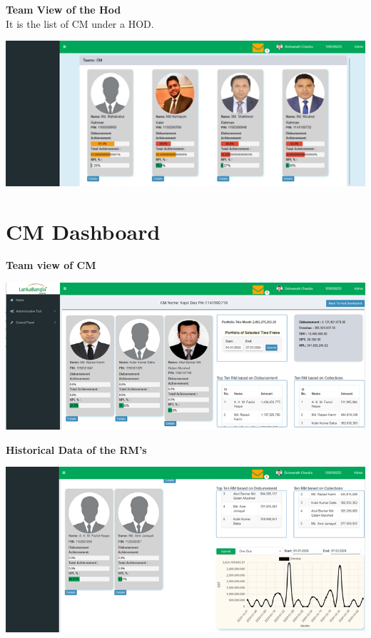 \documentclass{article}
\begin{document}
\textbf{Team View of the Hod}\\
It is the list of CM under a HOD.
\begin{center}
\includegraphics[width=1.0\textwidth]{image/hod_4.png}
\end{center}




\section{CM Dashboard}

\textbf{Team view of CM}
\begin{center}
\includegraphics[width=1.0\textwidth]{image/cm_dashboard_image.png}
\end{center}

\textbf{Historical Data of the RM's}
\begin{center}
\includegraphics[width=1.0\textwidth]{image/cm_2.png}
\end{center}
\end{document}
